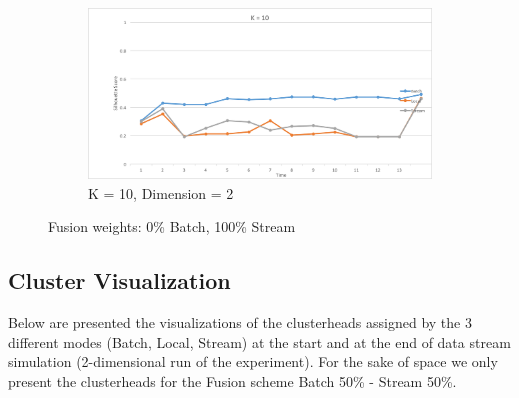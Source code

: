 \documentclass{lmproj}
\begin{document}
\begin{figure}[H]
	\begin{subfigure}{.5\textwidth}
		\centering
		\includegraphics[width=.8\linewidth]{silhouette/silhouette_0_100_k_10_dim_2}
		\caption*{K = 10, Dimension = 2}
		\label{fig:silhouette_0_100_k_10_dim_2}
	\end{subfigure}
	\caption{Fusion weights: 0\% Batch, 100\% Stream}
	\label{fig:fusion_0_100}
\end{figure}

\subsection{Cluster Visualization}

Below are presented the visualizations of the clusterheads assigned by the 3 different modes (Batch, Local, Stream) at the start and at the end of data stream simulation (2-dimensional run of the experiment). For the sake of space we only present the clusterheads for the Fusion scheme Batch 50\% - Stream 50\%. 
\end{document}
